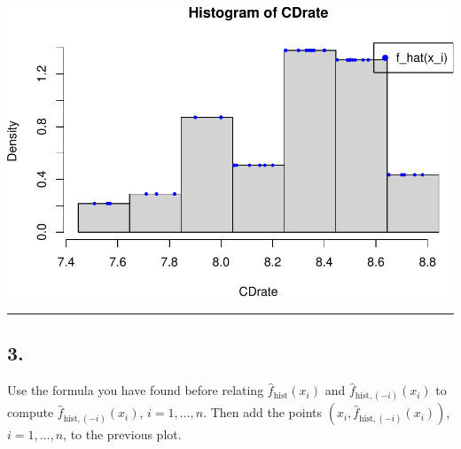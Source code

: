 \documentclass[
]{article}
\begin{document}
\begin{center}\includegraphics{20250930_AMA_Density_Estimation_files/figure-latex/plot_points_full-1} \end{center}

\begin{center}\rule{0.5\linewidth}{0.5pt}\end{center}

\subsection{3.}\label{section-2}

Use the formula you have found before relating
\(\hat{f}_{\mathrm{hist}}(x_i)\) and
\(\hat{f}_{\mathrm{hist},(-i)}(x_i)\) to compute
\(\hat{f}_{\mathrm{hist},(-i)}(x_i)\), \(i=1, \dots, n\). Then add the
points \((x_i,\hat{f}_{\mathrm{hist},(-i)}(x_i))\), \(i=1,\dots,n\), to
the previous plot.
\end{document}
